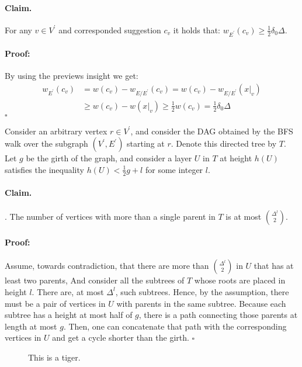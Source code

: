 \documentclass{article}
\begin{document}
\begin{multicols*}{2}
\paragraph{Claim.} For any $v \in V^\prime$ and corresponded suggestion $c_{v}$ it holds that: $w_{E^\prime}\left( c_{v} \right) \ge \frac{1}{2}\delta_{0}\Delta$. 
\paragraph{Proof:}By using the previews insight we get: \begin{equation*}
  \begin{split}
    w_{E^\prime}\left( c_{v} \right) &= w\left( c_{v} \right) - w_{E / E^\prime}\left( c_{v} \right) =  w\left( c_{v} \right) - w_{E / E^\prime}\left( x|_{v} \right) \\ 
     & \ge  w\left( c_{v} \right) - w\left( x|_{v} \right) \ge \frac{1}{2}w\left( c_{v} \right) = \frac{1}{2}\delta_{0}\Delta 
  \end{split}
\end{equation*}
$\square$

Consider an arbitrary vertex $r \in V^\prime$, and consider the DAG obtained by the BFS walk over the subgraph $\left(V^\prime, E^\prime \right)$ starting at $r$. Denote this directed tree by $T$.
Let $g$ be the girth of the graph, and consider a layer $U$ in $T$ at height $h\left( U \right)$ satisfies the inequality $ h\left( U \right) < \frac{1}{2}g + l$ for some integer $l$.
\begin{figure*}[th]
  \centering
        \resizebox{\columnwidth}{!}{%
	
}
\end{figure*}
\paragraph{Claim.}. The number of vertices with more than a single parent in $T$ is at most ${\Delta^l}\choose{2}$.  
\paragraph{Proof:}Assume, towards contradiction, that there are more than $ \Delta^l \choose 2 $ in $U$ that has at least two parents, And consider all the subtrees of $T$ whose roots are placed in height $l$. There are, at most $\Delta^l$, such subtrees. Hence, by the assumption, there must be a pair of vertices in $U$ with parents in the same subtree. Because each subtree has a height at most half of $g$, there is a path connecting those parents at length at most $g$. Then, one can concatenate that path with the corresponding vertices in $U$ and get a cycle shorter than the girth. $\square$
\begin{figure*}[t]

\caption{This is a tiger.}
\end{figure*}

\end{multicols*}
\end{document}
